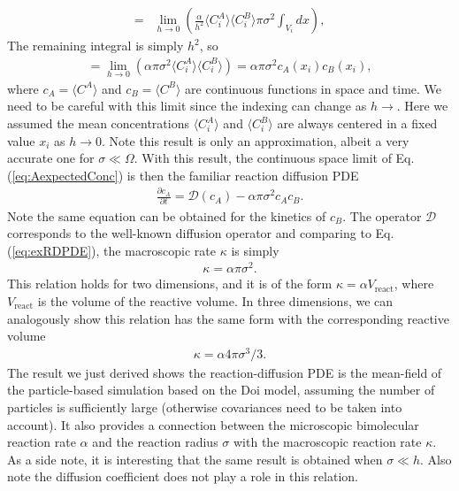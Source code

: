 \documentclass[10pt,twocolumn]{revtex4-1}
\begin{document}
	\begin{align*}
	= & \lim_{h\rightarrow 0} \left(\frac{\alpha }{h^2} \langle C^A_i\rangle \langle C^B_i \rangle  \pi \sigma^2 \int_{V_i}  dx \right),
	\end{align*}
	The remaining integral is simply $h^2$, so
	\begin{align*}
	=\lim_{h\rightarrow 0} \left(\alpha \pi \sigma^2 \langle C^A_i\rangle \langle C^B_i \rangle  \right) 
	= \alpha \pi \sigma^2 c_A(x_i) c_B(x_i),
	\end{align*}
	where $c_A = \langle C^A \rangle$ and $c_B = \langle C^B \rangle$ are continuous functions in space and time.
	We need to be careful with this limit since the indexing can change as $h\rightarrow$. Here we assumed the mean concentrations $\langle C^A_i\rangle$ and $\langle C^B_i \rangle$ are always centered in a fixed value $x_i$ as $h\rightarrow 0$. Note this result is only an approximation, albeit a very accurate one for $\sigma \ll \Omega$. With this result, the continuous space limit of Eq. (\ref{eq:AexpectedConc}) is then the familiar reaction diffusion PDE 
	\begin{align*}
	\frac{\partial c_A }{\partial t}= \mathcal{D}(c_A) - \alpha \pi \sigma^2  c_A c_B.
	\end{align*}
	Note the same equation can be obtained for the kinetics of $c_B$. The operator $\mathcal{D}$ corresponds to the well-known diffusion operator and comparing to Eq. (\ref{eq:exRDPDE}), the macroscopic rate $\kappa$ is simply
	\begin{align}
	\kappa = \alpha \pi \sigma^2.
	\label{eq:birateRel}
	\end{align}
	This relation holds for two dimensions, and it is of the form $\kappa = \alpha V_\text{react}$, where $V_\text{react}$ is the volume of the reactive volume. In three dimensions, we can analogously show this relation has the same form with the corresponding reactive volume
	\begin{align*}
	\kappa =  \alpha 4\pi \sigma^3/3.
	\end{align*}
	The result we just derived shows the reaction-diffusion PDE is the mean-field of the particle-based simulation based on the Doi model, assuming the number of particles is sufficiently large (otherwise covariances need to be taken into account). It also provides a connection between the microscopic bimolecular reaction rate $\alpha$ and the reaction radius $\sigma$ with the macroscopic reaction rate $\kappa$. As a side note, it is interesting that the same result is obtained when $\sigma \ll h$. Also note the diffusion coefficient does not play a role in this relation. 
	
\end{document}
